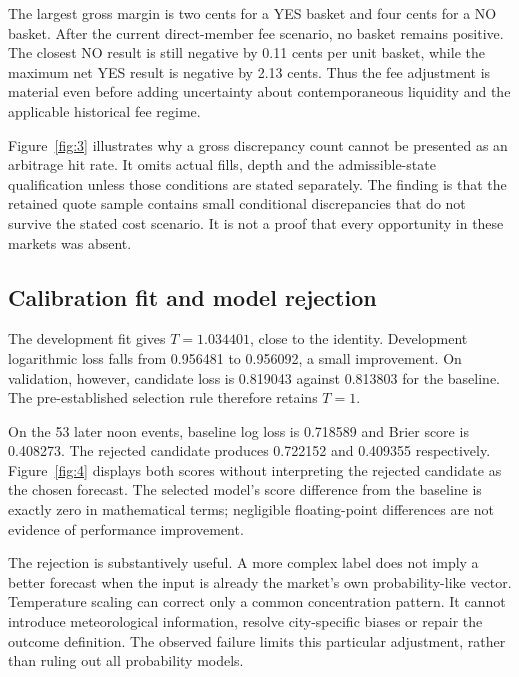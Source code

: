 
The largest gross margin is two cents for a YES basket and four cents for a NO basket. After the current direct-member fee scenario, no basket remains positive. The closest NO result is still negative by 0.11 cents per unit basket, while the maximum net YES result is negative by 2.13 cents. Thus the fee adjustment is material even before adding uncertainty about contemporaneous liquidity and the applicable historical fee regime.


Figure~\ref{fig:3} illustrates why a gross discrepancy count cannot be presented as an arbitrage hit rate. It omits actual fills, depth and the admissible-state qualification unless those conditions are stated separately. The finding is that the retained quote sample contains small conditional discrepancies that do not survive the stated cost scenario. It is not a proof that every opportunity in these markets was absent.

\subsection{Calibration fit and model rejection}
The development fit gives $T=1.034401$, close to the identity. Development logarithmic loss falls from 0.956481 to 0.956092, a small improvement. On validation, however, candidate loss is 0.819043 against 0.813803 for the baseline. The pre-established selection rule therefore retains $T=1$.


On the 53 later noon events, baseline log loss is 0.718589 and Brier score is 0.408273. The rejected candidate produces 0.722152 and 0.409355 respectively. Figure~\ref{fig:4} displays both scores without interpreting the rejected candidate as the chosen forecast. The selected model's score difference from the baseline is exactly zero in mathematical terms; negligible floating-point differences are not evidence of performance improvement.


The rejection is substantively useful. A more complex label does not imply a better forecast when the input is already the market's own probability-like vector. Temperature scaling can correct only a common concentration pattern. It cannot introduce meteorological information, resolve city-specific biases or repair the outcome definition. The observed failure limits this particular adjustment, rather than ruling out all probability models.

